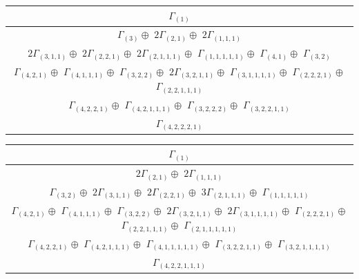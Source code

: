 \documentclass[main.tex]{subfiles}
\begin{document}
\begin{minipage}{1\textwidth}
\centering
\begin{tabular}{c}
$\Gamma_{(
1
)}$
\\ \hline
$\Gamma_{(
3
)} \oplus$
$2\Gamma_{(
2 , 
1
)} \oplus$
$2\Gamma_{(
1 , 
1 , 
1
)}$
\\ \hline
$2\Gamma_{(
3 , 
1 , 
1
)} \oplus$
$2\Gamma_{(
2 , 
2 , 
1
)} \oplus$
$2\Gamma_{(
2 , 
1 , 
1 , 
1
)} \oplus$
$\Gamma_{(
1 , 
1 , 
1 , 
1 , 
1
)} \oplus$
$\Gamma_{(
4 , 
1
)} \oplus$
$\Gamma_{(
3 , 
2
)}
$
\\ \hline
$\Gamma_{(
4 , 
2 , 
1
)} \oplus$
$\Gamma_{(
4 , 
1 , 
1 , 
1
)} \oplus$
$\Gamma_{(
3 , 
2 , 
2
)} \oplus$
$2\Gamma_{(
3 , 
2 , 
1 , 
1
)} \oplus$
$\Gamma_{(
3 , 
1 , 
1 , 
1 , 
1
)} \oplus$
$\Gamma_{(
2 , 
2 , 
2 , 
1
)} \oplus$
$\Gamma_{(
2 , 
2 , 
1 , 
1 , 
1
)}$
\\ \hline
$\Gamma_{(
4 , 
2 , 
2 , 
1
)} \oplus$
$\Gamma_{(
4 , 
2 , 
1 , 
1 , 
1
)} \oplus$
$\Gamma_{(
3 , 
2 , 
2 , 
2
)} \oplus$
$\Gamma_{(
3 , 
2 , 
2 , 
1 , 
1
)}$
\\ \hline
$\Gamma_{(
4 , 
2 , 
2 , 
2 , 
1
)}$
\\
\end{tabular}\end{minipage}
\bigskip
\begin{minipage}{1\textwidth}
\centering
\begin{tabular}{c}
$\Gamma_{(
1
)}$
\\ \hline
$2\Gamma_{(
2 , 
1
)} \oplus$
$2\Gamma_{(
1 , 
1 , 
1
)} $
\\ \hline
$\Gamma_{(
3 , 
2
)} \oplus$
$2\Gamma_{(
3 , 
1 , 
1
)} \oplus$
$2\Gamma_{(
2 , 
2 , 
1
)} \oplus$
$3\Gamma_{(
2 , 
1 , 
1 , 
1
)} \oplus$
$\Gamma_{(
1 , 
1 , 
1 , 
1 , 
1
)}
$
\\ \hline
$\Gamma_{(
4 , 
2 , 
1
)} \oplus$
$\Gamma_{(
4 , 
1 , 
1 , 
1
)} \oplus$
$\Gamma_{(
3 , 
2 , 
2
)} \oplus$
$2\Gamma_{(
3 , 
2 , 
1 , 
1
)} \oplus$
$2\Gamma_{(
3 , 
1 , 
1 , 
1 , 
1
)} \oplus$
$\Gamma_{(
2 , 
2 , 
2 , 
1
)} \oplus$
$\Gamma_{(
2 , 
2 , 
1 , 
1 , 
1
)} \oplus$
$\Gamma_{(
2 , 
1 , 
1 , 
1 , 
1 , 
1
)}$
\\ \hline
$\Gamma_{(
4 , 
2 , 
2 , 
1
)} \oplus$
$\Gamma_{(
4 , 
2 , 
1 , 
1 , 
1
)} \oplus$
$\Gamma_{(
4 , 
1 , 
1 , 
1 , 
1 , 
1
)} \oplus$
$\Gamma_{(
3 , 
2 , 
2 , 
1 , 
1
)} \oplus$
$\Gamma_{(
3 , 
2 , 
1 , 
1 , 
1 , 
1
)}$
\\ \hline
$\Gamma_{(
4 , 
2 , 
2 , 
1 , 
1 , 
1
)}$
\\
\end{tabular}\end{minipage}
\end{document}
